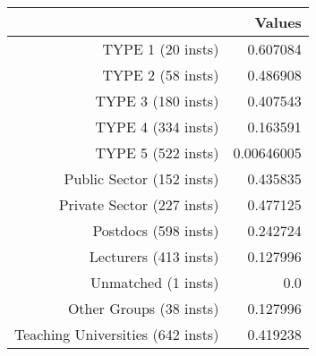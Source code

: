 \begin{tabular}{rr}
  \hline
   & \textbf{Values} \\\hline
  TYPE 1 (20 insts) & 0.607084 \\
  TYPE 2 (58 insts) & 0.486908 \\
  TYPE 3 (180 insts) & 0.407543 \\
  TYPE 4 (334 insts) & 0.163591 \\
  TYPE 5 (522 insts) & 0.00646005 \\
  Public Sector (152 insts) & 0.435835 \\
  Private Sector (227 insts) & 0.477125 \\
  Postdocs (598 insts) & 0.242724 \\
  Lecturers (413 insts) & 0.127996 \\
  Unmatched (1 insts) & 0.0 \\
  Other Groups (38 insts) & 0.127996 \\
  Teaching Universities (642 insts) & 0.419238 \\\hline
\end{tabular}
